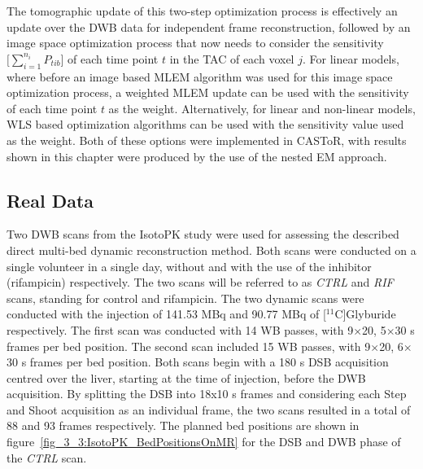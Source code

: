 The tomographic update of this two-step optimization process is effectively an update over the DWB data for independent frame reconstruction, followed by an image space optimization process that now needs to consider the sensitivity $\big[\sum_{i=1}^{n_i} P_{tib}\big]$ of each time point $t$ in the TAC of each voxel $j$. For linear models, where before an image based MLEM algorithm was used for this image space optimization process, a weighted MLEM update can be used with the sensitivity of each time point $t$ as the weight. Alternatively, for linear and non-linear models, WLS based optimization algorithms can be used with the sensitivity value used as the weight. Both of these options were implemented in CASToR, with results shown in this chapter were produced by the use of the nested EM approach.
%

%
\subsection{Real Data}
Two DWB scans from the IsotoPK study were used for assessing the described direct multi-bed dynamic reconstruction method. Both scans were conducted on a single volunteer in a single day, without and with the use of the inhibitor (rifampicin) respectively. The two scans will be referred to as \textit{CTRL} and \textit{RIF} scans, standing for control and rifampicin. %
The two dynamic scans were conducted with the injection of 141.53 MBq and 90.77 MBq of [$^{11}$C]Glyburide respectively. The first scan was conducted with 14 WB passes, with 9$\times$20, 5$\times$30 s frames per bed position. The second scan included 15 WB passes, with 9$\times$20, 6$\times$30 s frames per bed position. Both scans begin with a 180 s DSB acquisition centred over the liver, starting at the time of injection, before the DWB acquisition. By splitting the DSB into 18x10 s frames and considering each Step and Shoot acquisition as an individual frame, the two scans resulted in a total of 88 and 93 frames respectively. 
The planned bed positions are shown in figure~\ref{fig_3_3:IsotoPK_BedPositionsOnMR} for the DSB and DWB phase of the \textit{CTRL} scan. 

